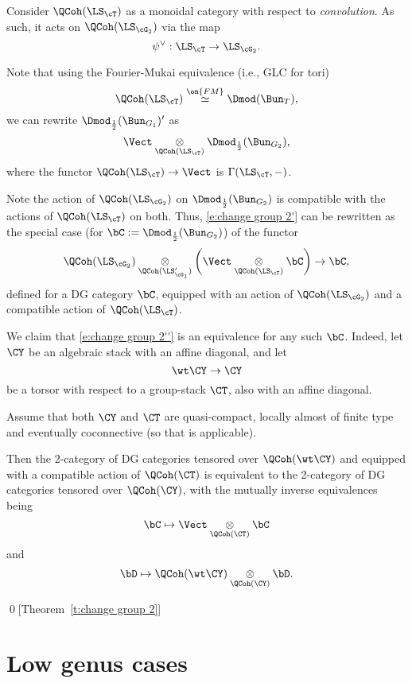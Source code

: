 \documentclass[9pt]{amsart}
\theoremstyle{remark}
\theoremstyle{definition}
\theoremstyle{remark}
\newcommand{\thmref}[1]{Theorem~\ref{#1}}
\numberwithin{equation}{section}
\begin{document}
\sssec{}

Consider $\QCoh(\LS_\cT)$ as a monoidal category with respect to \emph{convolution}. As such,
it acts on $\QCoh(\LS_{\cG_2})$ via the map 
$$\psi^\vee:\LS_\cT\to \LS_{\cG_2}.$$

\medskip

Note that using the Fourier-Mukai equivalence (i.e., GLC for tori)
$$\QCoh(\LS_\cT) \overset{\on{FM}}\simeq \Dmod(\Bun_T),$$
we can rewrite $\Dmod_{\frac{1}{2}}(\Bun_{G_1})'$ as
$$\Vect\underset{\QCoh(\LS_\cT)}\otimes \Dmod_{\frac{1}{2}}(\Bun_{G_2}),$$
where the functor $\QCoh(\LS_\cT)\to \Vect$ is $\Gamma(\LS_\cT,-)$.

\sssec{}

Note the action of $\QCoh(\LS_{\cG_2})$ on $\Dmod_{\frac{1}{2}}(\Bun_{G_2})$ is compatible with 
the actions of $\QCoh(\LS_\cT)$ on both. Thus, \eqref{e:change group 2'} can be rewritten as the special
case (for $\bC:=\Dmod_{\frac{1}{2}}(\Bun_{G_2})$) of the functor 
\begin{equation} \label{e:change group 2''}
\QCoh(\LS_{\cG_2})\underset{\QCoh(\LS'_{\cG_1})}\otimes  
\left(\Vect\underset{\QCoh(\LS_\cT)}\otimes \bC\right) \to \bC,
\end{equation}
defined for a DG category $\bC$, equipped with an action of $\QCoh(\LS_{\cG_2})$ and a compatible action of
$\QCoh(\LS_\cT)$.

\sssec{}

We claim that \eqref{e:change group 2''} is an equivalence for any such $\bC$. Indeed, let
$\CY$ be an algebraic stack with an affine diagonal, and let 
$$\wt\CY\to \CY$$
be a torsor with respect to a group-stack $\CT$, also with an affine diagonal. 

\medskip

Assume that both $\CY$ and $\CT$ are quasi-compact, locally almost of finite type and eventually coconnective
(so that \cite[Theorem 2.2.6]{Ga3} is applicable). 

\medskip

Then the 2-category of DG categories tensored over $\QCoh(\wt\CY)$ and equipped with a compatible
action of $\QCoh(\CT)$ is equivalent to the 2-category of DG categories tensored over $\QCoh(\CY)$,
with the mutually inverse equivalences being
$$\bC \mapsto \Vect\underset{\QCoh(\CT)}\otimes \bC$$
and
$$\bD\mapsto \QCoh(\wt\CY) \underset{\QCoh(\CY)}\otimes \bD.$$

\qed[\thmref{t:change group 2}]


\section{Low genus cases} \label{s:low genus}
\end{document}

